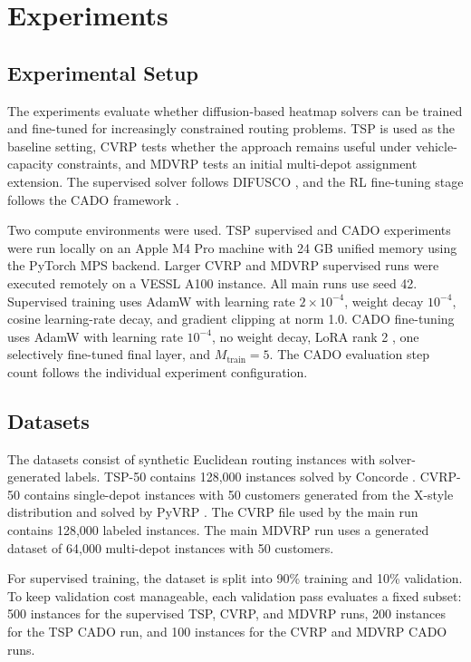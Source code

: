\chapter{Experiments}
\label{ch:experiments}

\section{Experimental Setup}
\label{sec:setup}

The experiments evaluate whether diffusion-based heatmap solvers can be trained and fine-tuned for increasingly constrained routing problems. TSP is used as the baseline setting, CVRP tests whether the approach remains useful under vehicle-capacity constraints, and MDVRP tests an initial multi-depot assignment extension. The supervised solver follows DIFUSCO \citep{sun2023difusco}, and the RL fine-tuning stage follows the CADO framework \citep{yoon2024cado}.

Two compute environments were used. TSP supervised and CADO experiments were run locally on an Apple M4 Pro machine with 24 GB unified memory using the PyTorch MPS backend. Larger CVRP and MDVRP supervised runs were executed remotely on a VESSL A100 instance. All main runs use seed 42. Supervised training uses AdamW \citep{loshchilov2019decoupled} with learning rate $2\times10^{-4}$, weight decay $10^{-4}$, cosine learning-rate decay, and gradient clipping at norm 1.0. CADO fine-tuning uses AdamW with learning rate $10^{-4}$, no weight decay, LoRA rank 2 \citep{hu2022lora}, one selectively fine-tuned final layer, and $M_{\mathrm{train}}=5$. The CADO evaluation step count follows the individual experiment configuration.

\section{Datasets}
\label{sec:datasets}

The datasets consist of synthetic Euclidean routing instances with solver-generated labels.
TSP-50 contains 128,000 instances solved by Concorde \citep{applegate2006traveling}. CVRP-50 contains single-depot instances
with 50 customers generated from the X-style distribution and solved by PyVRP \citep{wouda2024pyvrp}. The CVRP file
used by the main run contains 128,000 labeled instances. The main MDVRP run uses a generated
dataset of 64,000 multi-depot instances with 50 customers.

For supervised training, the dataset is split into 90\% training and 10\% validation. To keep
validation cost manageable, each validation pass evaluates a fixed subset: 500 instances for
the supervised TSP, CVRP, and MDVRP runs, 200 instances for the TSP CADO run, and 100 instances for the CVRP and MDVRP CADO runs.

